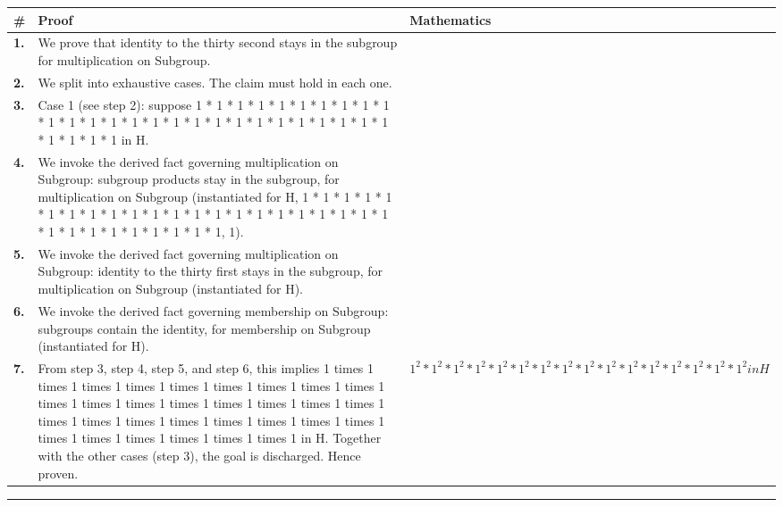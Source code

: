 \documentclass[11pt]{article}
\theoremstyle{definition}
\begin{document}
\begin{tabular}{@{} >{\raggedright\arraybackslash}p{} >{\raggedright\arraybackslash}p{} >{\raggedleft\arraybackslash}p{} @{}}
\textbf{\#} & \textbf{Proof} & \textbf{Mathematics} \\
\midrule
\textbf{1.} & We prove that identity to the thirty second stays in the subgroup for multiplication on Subgroup. & \\[0.45em]
\textbf{2.} & We split into exhaustive cases. The claim must hold in each one. & \\[0.45em]
\textbf{3.} & Case 1 (see step 2): suppose 1 * 1 * 1 * 1 * 1 * 1 * 1 * 1 * 1 * 1 * 1 * 1 * 1 * 1 * 1 * 1 * 1 * 1 * 1 * 1 * 1 * 1 * 1 * 1 * 1 * 1 * 1 * 1 * 1 * 1 * 1 in H. & \\[0.45em]
\textbf{4.} & We invoke the derived fact governing multiplication on Subgroup: subgroup products stay in the subgroup, for multiplication on Subgroup (instantiated for H, 1 * 1 * 1 * 1 * 1 * 1 * 1 * 1 * 1 * 1 * 1 * 1 * 1 * 1 * 1 * 1 * 1 * 1 * 1 * 1 * 1 * 1 * 1 * 1 * 1 * 1 * 1 * 1 * 1 * 1 * 1, 1). & \\[0.45em]
\textbf{5.} & We invoke the derived fact governing multiplication on Subgroup: identity to the thirty first stays in the subgroup, for multiplication on Subgroup (instantiated for H). & \\[0.45em]
\textbf{6.} & We invoke the derived fact governing membership on Subgroup: subgroups contain the identity, for membership on Subgroup (instantiated for H). & \\[0.45em]
\textbf{7.} & From step 3, step 4, step 5, and step 6, this implies 1 times 1 times 1 times 1 times 1 times 1 times 1 times 1 times 1 times 1 times 1 times 1 times 1 times 1 times 1 times 1 times 1 times 1 times 1 times 1 times 1 times 1 times 1 times 1 times 1 times 1 times 1 times 1 times 1 times 1 times 1 times 1 in H. Together with the other cases (step 3), the goal is discharged. Hence proven. & $\displaystyle 1^{2} * 1^{2} * 1^{2} * 1^{2} * 1^{2} * 1^{2} * 1^{2} * 1^{2} * 1^{2} * 1^{2} * 1^{2} * 1^{2} * 1^{2} * 1^{2} * 1^{2} * 1^{2} in H$ \\[0.45em]
\bottomrule
\end{tabular}
\label{thm:Subgroup-multiplication-identity_to_the_thirty_second_stays_in_the_subgroup}
\par\medskip\hrule
\end{document}
